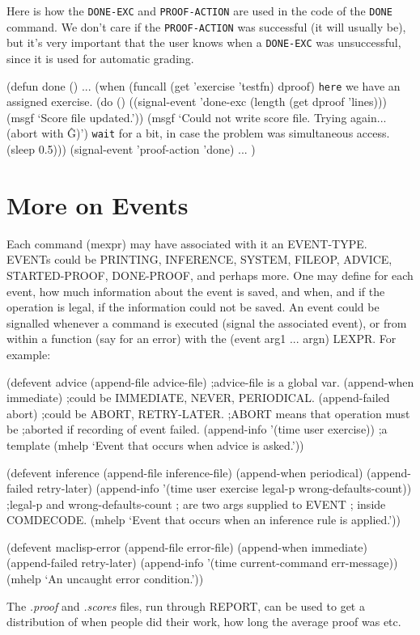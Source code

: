 Here is how the {\tt DONE-EXC} and {\tt PROOF-ACTION} are used in the code of
the {\tt DONE} command.  We don't care if the {\tt PROOF-ACTION} was successful
(it will usually be), but it's very important that the user knows
when a {\tt DONE-EXC} was unsuccessful, since it is used for automatic
grading.

\begin{tpsexample}
(defun done ()
  ...
  (when (funcall (get 'exercise 'testfn) dproof)
	{\tt  here} we have an assigned exercise.
	(do ()
	    ((signal-event 'done-exc (length (get dproof 'lines)))
	     (msgf `Score file updated.'))
	  (msgf `Could not write score file.  Trying again... (abort with \^G)')
	  {\tt  wait} for a bit, in case the problem was simultaneous access.
	  (sleep 0.5)))
  (signal-event 'proof-action 'done)
  ...
  )
\end{tpsexample}

\section{More on Events}

Each command (mexpr) may have associated with
it an EVENT-TYPE.  EVENTs could be PRINTING, INFERENCE, SYSTEM, FILEOP,
ADVICE, STARTED-PROOF, DONE-PROOF, and perhaps more.  One may define for
each event, how much information about the event is saved, and when, and
if the operation is legal, if the information could not be saved.
An event could be signalled whenever a command is executed (signal the
associated event), or from within a function (say for an error) with
the (event arg1 ... argn) LEXPR.
For example:
\begin{tpsexample}
(defevent advice
  (append-file advice-file)		;advice-file is a global var.
  (append-when immediate)		;could be IMMEDIATE, NEVER, PERIODICAL.
  (append-failed abort)			;could be ABORT, RETRY-LATER.
					;ABORT means that operation must be
					;aborted if recording of event failed.
  (append-info '(time user exercise))	;a template
  (mhelp `Event that occurs when advice is asked.'))

(defevent inference
  (append-file inference-file)
  (append-when periodical)
  (append-failed retry-later)
  (append-info '(time user exercise legal-p wrong-defaults-count))
					;legal-p and wrong-defaults-count
					; are two args supplied to EVENT
					; inside COMDECODE.
  (mhelp `Event that occurs when an inference rule is applied.'))

(defevent maclisp-error
  (append-file error-file)
  (append-when immediate)
  (append-failed retry-later)
  (append-info '(time current-command err-message))
  (mhelp `An uncaught error condition.'))

\end{tpsexample}
The {\it .proof} and {\it .scores} files, run through REPORT,
can be used to get a distribution of when people did their work, how long
the average proof was etc.

